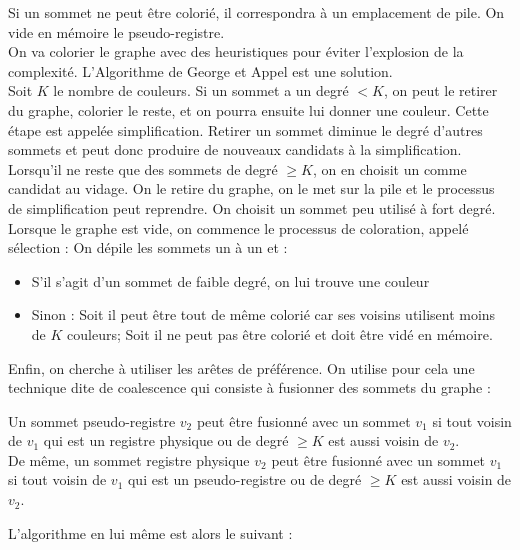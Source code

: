 \documentclass{cours}
\begin{document}
Si un sommet ne peut être colorié, il correspondra à un emplacement de pile. On vide en mémoire le pseudo-registre.\\
On va colorier le graphe avec des heuristiques pour éviter l'explosion de la complexité. L'Algorithme de George et Appel est une solution.\\
Soit $K$ le nombre de couleurs. Si un sommet a un degré $< K$, on peut le retirer du graphe, colorier le reste, et on pourra ensuite lui donner une couleur. Cette étape est appelée simplification. Retirer un sommet diminue le degré d'autres sommets et peut donc produire de nouveaux candidats à la simplification. \\
Lorsqu'il ne reste que des sommets de degré $\geq K$, on en choisit un comme candidat au vidage. On le retire du graphe, on le met sur la pile et le processus de simplification peut reprendre. On choisit un sommet peu utilisé à fort degré. \\
Lorsque le graphe est vide, on commence le processus de coloration, appelé sélection : On dépile les sommets un à un et :
\begin{itemize}
    \item S'il s'agit d'un sommet de faible degré, on lui trouve une couleur
    \item Sinon : Soit il peut être tout de même colorié car ses voisins utilisent moins de $K$ couleurs; Soit il ne peut pas être colorié et doit être vidé en mémoire.
\end{itemize}
Enfin, on cherche à utiliser les arêtes de préférence. On utilise pour cela une technique dite de coalescence qui consiste à fusionner des sommets du graphe :
\begin{definition}
    Un sommet pseudo-registre $v_{2}$ peut être fusionné avec un sommet $v_{1}$ si tout voisin de $v_{1}$ qui est un registre physique ou de degré $\geq K$ est aussi voisin de $v_{2}$.\\
    De même, un sommet registre physique $v_{2}$ peut être fusionné avec un sommet $v_{1}$ si tout voisin de $v_{1}$ qui est un pseudo-registre ou de degré $\geq K$ est aussi voisin de $v_{2}$.
\end{definition}
L'algorithme en lui même est alors le suivant :
\end{document}
